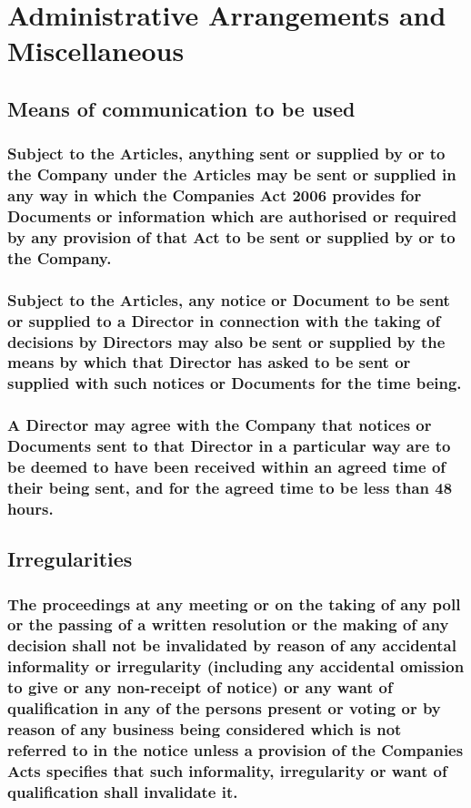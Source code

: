 \documentclass[12pt]{article}
\begin{document}
\section*{Administrative Arrangements and Miscellaneous}
\subsection{Means of communication to be used}
\subsubsection{Subject to the Articles, anything sent or supplied by or to the Company under the Articles may be sent or supplied in any way in which the Companies Act 2006 provides for Documents or information which are authorised or required by any provision of that Act to be sent or supplied by or to the Company.}
\subsubsection{Subject to the Articles, any notice or Document to be sent or supplied to a Director in connection with the taking of decisions by Directors may also be sent or supplied by the means by which that Director has asked to be sent or supplied with such notices or Documents for the time being.}
\subsubsection{A Director may agree with the Company that notices or Documents sent to that Director in a particular way are to be deemed to have been received within an agreed time of their being sent, and for the agreed time to be less than 48 hours.}

\subsection{Irregularities}
\subsubsection{The proceedings at any meeting or on the taking of any poll or the passing of a written resolution or the making of any decision shall not be invalidated by reason of any accidental informality or irregularity (including any accidental omission to give or any non-receipt of notice) or any want of qualification in any of the persons present or voting or by reason of any business being considered which is not referred to in the notice unless a provision of the Companies Acts specifies that such informality, irregularity or want of qualification shall invalidate it.}
\end{document}
